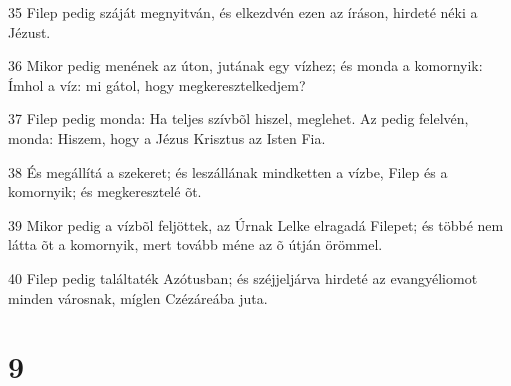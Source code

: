 \par 35 Filep pedig száját megnyitván, és elkezdvén ezen az íráson, hirdeté néki a Jézust.
\par 36 Mikor pedig menének az úton, jutának egy vízhez; és monda a komornyik: Ímhol a víz: mi gátol, hogy megkeresztelkedjem?
\par 37 Filep pedig monda: Ha teljes szívbõl hiszel, meglehet. Az pedig felelvén, monda: Hiszem, hogy a Jézus Krisztus az Isten Fia.
\par 38 És megállítá a szekeret; és leszállának mindketten a vízbe, Filep és a komornyik; és megkeresztelé õt.
\par 39 Mikor pedig a vízbõl feljöttek, az Úrnak Lelke elragadá Filepet; és többé nem látta õt a komornyik, mert tovább méne az õ útján örömmel.
\par 40 Filep pedig találtaték Azótusban; és széjjeljárva hirdeté az evangyéliomot minden városnak, míglen Czézáreába juta.

\chapter{9}

